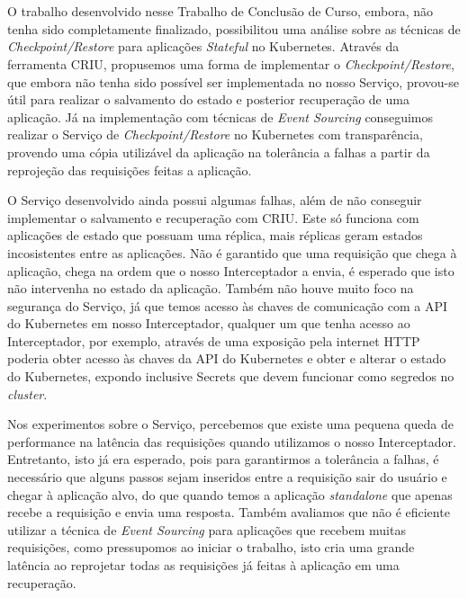 

\chapter{} \label{cap:conclusion}

	O trabalho desenvolvido nesse Trabalho de Conclusão de Curso, embora, não 
	tenha sido completamente finalizado, possibilitou uma análise sobre as técnicas
	de \textit{Checkpoint/Restore} para aplicações \textit{Stateful} no Kubernetes.
	Através da ferramenta CRIU, propusemos uma forma de implementar o
	\textit{Checkpoint/Restore}, que embora não tenha sido possível ser implementada
	no nosso Serviço, provou-se útil para realizar o salvamento do estado e posterior
	recuperação de uma aplicação. Já na implementação com técnicas de
	\textit{Event Sourcing} conseguimos realizar o Serviço de \textit{Checkpoint/Restore}
	no Kubernetes com transparência, provendo uma cópia utilizável da aplicação na
	tolerância a falhas a partir da reprojeção das requisições feitas a aplicação.
	
	O Serviço desenvolvido ainda possui algumas falhas, além de não conseguir
	implementar	o salvamento e recuperação com CRIU. Este só funciona com aplicações
	de estado que possuam uma réplica, mais réplicas geram estados incosistentes
	entre as aplicações. Não é garantido que uma requisição que chega à aplicação,
	chega na ordem que o nosso Interceptador a envia, é esperado que isto não
	intervenha no estado da aplicação. Também não houve muito foco na segurança do
	Serviço, já que temos acesso às chaves de comunicação com a API do Kubernetes
	em nosso Interceptador, qualquer um que tenha acesso ao Interceptador, por
	exemplo, através de uma exposição pela internet HTTP poderia obter acesso às
	chaves da API do Kubernetes e obter e alterar o estado do Kubernetes, expondo
	inclusive Secrets que devem funcionar como segredos no \textit{cluster}.
	
	Nos experimentos sobre o Serviço, percebemos que existe uma pequena queda de
	performance na latência das requisições quando utilizamos o nosso Interceptador.
	Entretanto, isto já era esperado, pois para garantirmos a tolerância a falhas, é
	necessário que alguns passos sejam inseridos entre a requisição sair do usuário e
	chegar à aplicação alvo, do que quando temos a aplicação \textit{standalone} que
	apenas recebe a requisição e envia uma resposta. Também avaliamos que não é
	eficiente utilizar a técnica de \textit{Event Sourcing} para aplicações que
	recebem muitas requisições, como pressupomos ao iniciar o trabalho, isto cria uma
	grande latência ao reprojetar todas as requisições já feitas à aplicação em uma
	recuperação.
	
